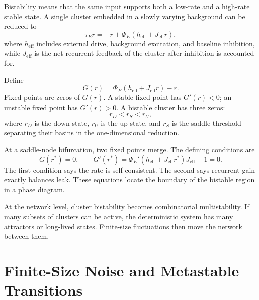 Bistability means that the same input supports both a low-rate and a high-rate stable state. A single cluster embedded in a slowly varying background can be reduced to
%
\begin{equation}
  \tau_E \dot r
  =
  -r
  +
  \Phi_E\!\left(h_{\mathrm{eff}}+J_{\mathrm{eff}}r\right),
  \label{eq:single-cluster-bistability}
\end{equation}
%
where $h_{\mathrm{eff}}$ includes external drive, background excitation, and baseline inhibition, while $J_{\mathrm{eff}}$ is the net recurrent feedback of the cluster after inhibition is accounted for.

Define
%
\begin{equation}
  G(r)
  =
  \Phi_E(h_{\mathrm{eff}}+J_{\mathrm{eff}}r)-r .
  \label{eq:bistability-nullcline-function}
\end{equation}
%
Fixed points are zeros of $G(r)$. A stable fixed point has $G'(r)<0$; an unstable fixed point has $G'(r)>0$. A bistable cluster has three zeros:
%
\begin{equation}
  r_D < r_S < r_U ,
  \label{eq:down-saddle-up}
\end{equation}
%
where $r_D$ is the down-state, $r_U$ is the up-state, and $r_S$ is the saddle threshold separating their basins in the one-dimensional reduction.

At a saddle-node bifurcation, two fixed points merge. The defining conditions are
%
\begin{equation}
  G(r^*)=0,
  \qquad
  G'(r^*)=\Phi_E'(h_{\mathrm{eff}}+J_{\mathrm{eff}}r^*)J_{\mathrm{eff}}-1=0 .
  \label{eq:ch10-saddle-node-conditions}
\end{equation}
%
The first condition says the rate is self-consistent. The second says recurrent gain exactly balances leak. These equations locate the boundary of the bistable region in a phase diagram.

At the network level, cluster bistability becomes combinatorial multistability. If many subsets of clusters can be active, the deterministic system has many attractors or long-lived states. Finite-size fluctuations then move the network between them.

\section{Finite-Size Noise and Metastable Transitions}
\label{sec:finite-size-noise-metastable-transitions}

